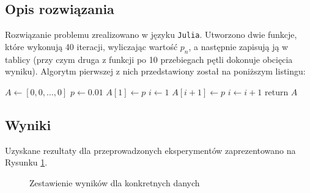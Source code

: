 \documentclass{classrep}
\begin{document}
	\subsection{Opis rozwiązania}
		Rozwiązanie problemu zrealizowano w języku \texttt{Julia}. Utworzono dwie funkcje, które wykonują 40 iteracji, wyliczając wartość $p_n$, a następnie zapisują ją w tablicy (przy czym druga z funkcji po 10 przebiegach pętli dokonuje obcięcia wyniku). Algorytm pierwszej z nich przedstawiony został na poniższym listingu:
		
		\begin{algorithm}
			\begin{algorithmic}
				\State $A \gets [0,0,\dots,0]$
				\State $p\gets 0.01$
				\State $A[1] \gets p$
				\State $i \gets 1$
					\State $A[i+1] \gets p$
					\State $i \gets i+1$
				\EndWhile
				\State return $A$
			\end{algorithmic}
			\caption{}
		\end{algorithm}		
		
	\subsection{Wyniki}
		Uzyskane rezultaty dla przeprowadzonych eksperymentów zaprezentowano na Rysunku \ref{fig:4}.
		
		\begin{figure}[htbp]
			\centering
			 \hfill
  			\caption{Zestawienie wyników dla konkretnych danych}
  			\label{fig:4}
		\end{figure}		
		
\end{document}
